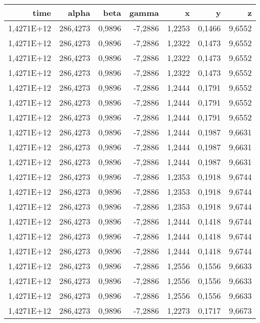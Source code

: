 \begin{table}[htbp]
  \centering
    \begin{tabular}{rrrrrrr}
    \toprule
    time  & alpha & beta  & gamma & x     & y     & z \\
    \midrule
    1,4271E+12 & 286,4273 & 0,9896 & -7,2886 & 1,2253 & 0,1466 & 9,6552 \\
    1,4271E+12 & 286,4273 & 0,9896 & -7,2886 & 1,2322 & 0,1473 & 9,6552 \\
    1,4271E+12 & 286,4273 & 0,9896 & -7,2886 & 1,2322 & 0,1473 & 9,6552 \\
    1,4271E+12 & 286,4273 & 0,9896 & -7,2886 & 1,2322 & 0,1473 & 9,6552 \\
    1,4271E+12 & 286,4273 & 0,9896 & -7,2886 & 1,2444 & 0,1791 & 9,6552 \\
    1,4271E+12 & 286,4273 & 0,9896 & -7,2886 & 1,2444 & 0,1791 & 9,6552 \\
    1,4271E+12 & 286,4273 & 0,9896 & -7,2886 & 1,2444 & 0,1791 & 9,6552 \\
    1,4271E+12 & 286,4273 & 0,9896 & -7,2886 & 1,2444 & 0,1987 & 9,6631 \\
    1,4271E+12 & 286,4273 & 0,9896 & -7,2886 & 1,2444 & 0,1987 & 9,6631 \\
    1,4271E+12 & 286,4273 & 0,9896 & -7,2886 & 1,2444 & 0,1987 & 9,6631 \\
    1,4271E+12 & 286,4273 & 0,9896 & -7,2886 & 1,2353 & 0,1918 & 9,6744 \\
    1,4271E+12 & 286,4273 & 0,9896 & -7,2886 & 1,2353 & 0,1918 & 9,6744 \\
    1,4271E+12 & 286,4273 & 0,9896 & -7,2886 & 1,2353 & 0,1918 & 9,6744 \\
    1,4271E+12 & 286,4273 & 0,9896 & -7,2886 & 1,2444 & 0,1418 & 9,6744 \\
    1,4271E+12 & 286,4273 & 0,9896 & -7,2886 & 1,2444 & 0,1418 & 9,6744 \\
    1,4271E+12 & 286,4273 & 0,9896 & -7,2886 & 1,2444 & 0,1418 & 9,6744 \\
    1,4271E+12 & 286,4273 & 0,9896 & -7,2886 & 1,2556 & 0,1556 & 9,6633 \\
    1,4271E+12 & 286,4273 & 0,9896 & -7,2886 & 1,2556 & 0,1556 & 9,6633 \\
    1,4271E+12 & 286,4273 & 0,9896 & -7,2886 & 1,2556 & 0,1556 & 9,6633 \\
    1,4271E+12 & 286,4273 & 0,9896 & -7,2886 & 1,2273 & 0,1717 & 9,6673 \\

\end{tabular}
\end{table}
